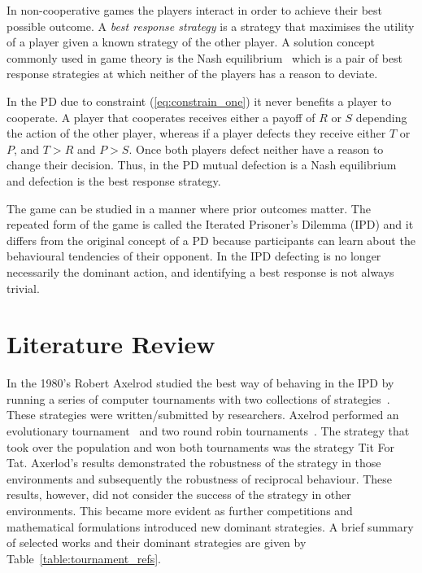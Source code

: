 In non-cooperative games the players interact in order to achieve their best 
possible outcome. A \textit{best response strategy} is a strategy
that maximises the utility of a player given a known strategy of the other
player. A solution concept commonly used in game theory is the Nash equilibrium~\cite{Nash1951}
which is a pair of best response strategies at which neither of the players has
a reason to deviate.

In the PD due to constraint (\ref{eq:constrain_one}) it never benefits a player
to cooperate. A player that cooperates receives either a payoff of \(R\) or \(S\)
depending the action of the other player, whereas if a player defects they
receive either \(T\) or \(P\), and \(T > R\) and \(P > S\). Once both
players defect neither have a reason to change their decision. Thus, in the
PD mutual defection is a Nash equilibrium and defection is the
best response strategy.

The game can be studied in a manner where prior outcomes matter. The repeated
form of the game is called the Iterated Prisoner's Dilemma (IPD) and it differs
from the original concept of a PD because participants can learn about the
behavioural tendencies of their opponent. In the IPD defecting is no
longer necessarily the dominant action, and identifying a best response is not
always trivial.

\section{Literature Review}\label{section:introduction_brief_literature}

In the 1980's Robert Axelrod studied the best way of behaving in the IPD by
running a series of computer tournaments with two collections of
strategies~\cite{Axelrod1984}. These strategies were written/submitted by
researchers. Axelrod performed an evolutionary tournament~\cite{Axelrod1981} and
two round robin tournaments~\cite{Axelrod1980a, Axelrod1980b}. The strategy that
took over the population and won both tournaments was the strategy Tit For Tat.
Axerlod's results demonstrated the robustness of the strategy in those
environments and subsequently the robustness of reciprocal behaviour. These
results, however, did not consider the success of the strategy in other
environments. This became more evident as further competitions and mathematical
formulations introduced new dominant strategies. A
brief summary of selected works and their dominant strategies are given by
Table~\ref{table:tournament_refs}.

